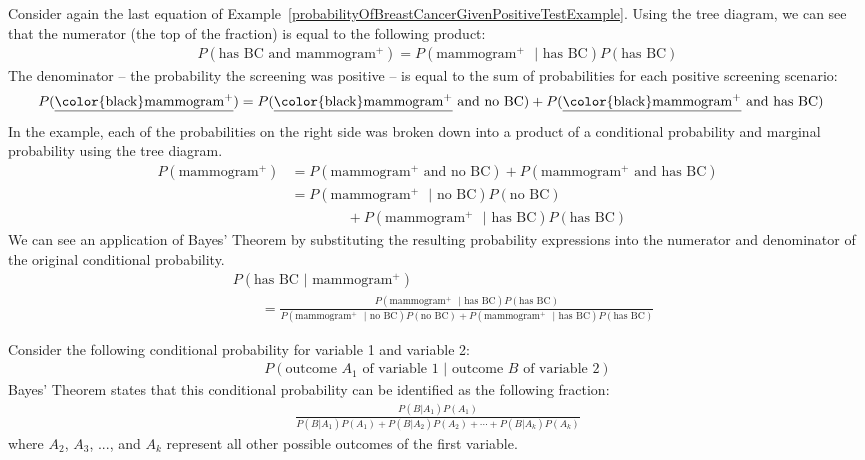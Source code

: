 \begin{doublespace}
Consider again the last equation of Example~\ref{probabilityOfBreastCancerGivenPositiveTestExample}.
Using the tree diagram, we can see that the numerator (the top of the fraction) is equal to the following product:
\begin{align*}
P(\text{has BC and mammogram$^+$}) = P(\text{mammogram$^+$ } | \text{ has BC})P(\text{has BC})
\end{align*}
The denominator -- the probability the screening was positive -- is equal to the sum of probabilities for each positive screening scenario:
\begin{align*}
P(\text{\underline{\color{black}mammogram$^+$}})
	&= P(\text{\underline{\color{black}mammogram$^+$} and no BC})
		+ P(\text{\underline{\color{black}mammogram$^+$} and has BC})
\end{align*}
In the example, each of the probabilities on the right side was broken down into a product of a conditional probability and marginal probability using the tree diagram.
\begin{align*}
P(\text{mammogram$^+$})
	&= P(\text{mammogram$^+$ and no BC}) + P(\text{mammogram$^+$ and has BC}) \\
	&= P(\text{mammogram$^+$ } | \text{ no BC})P(\text{no BC}) \\
			   &\qquad\qquad + P(\text{mammogram$^+$ } | \text{ has BC})P(\text{has BC})
\end{align*}
We can see an application of Bayes' Theorem by substituting the resulting probability expressions into the numerator and denominator of the original conditional probability.
\begin{align*}
& P(\text{has BC } | \text{ mammogram$^+$})  \\
& \qquad= \frac{P(\text{mammogram$^+$ } | \text{ has BC})P(\text{has BC})}
	{P(\text{mammogram$^+$ } | \text{ no BC})P(\text{no BC}) + P(\text{mammogram$^+$ } | \text{ has BC})P(\text{has BC})}
\end{align*}

\begin{termBox}{
Consider the following conditional probability for variable 1 and variable 2:\vspace{-1.5mm}
\begin{align*}
P(\text{outcome $A_1$ of variable 1 } | \text{ outcome $B$ of variable 2})
\end{align*}
Bayes' Theorem states that this conditional probability can be identified as the following fraction:\vspace{-1.5mm}
\begin{align}
\frac{P(B | A_1) P(A_1)}
	{P(B | A_1) P(A_1) + P(B | A_2) P(A_2) + \cdots + P(B | A_k) P(A_k)}
	\label{equationOfBayesTheorem}
\end{align}
where $A_2$, $A_3$, ..., and $A_k$ represent all other possible outcomes of the first variable.}
\end{termBox}


\end{doublespace}

